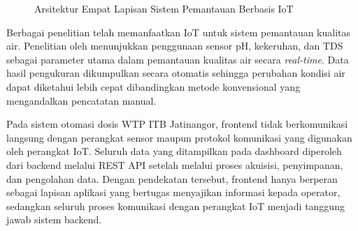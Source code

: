 \begin{figure}[H]
  \centering
  \caption{Arsitektur Empat Lapisan Sistem Pemantauan Berbasis IoT}
  \label{fig:arsitektur-iot}
\end{figure}

Berbagai penelitian telah memanfaatkan IoT untuk sistem pemantauan kualitas air.
Penelitian oleh \textcite{kumar2024iot} menunjukkan penggunaan sensor pH,
kekeruhan, dan TDS sebagai parameter utama dalam pemantauan kualitas air secara
\textit{real-time}. Data hasil pengukuran dikumpulkan secara otomatis sehingga
perubahan kondisi air dapat diketahui lebih cepat dibandingkan metode
konvensional yang mengandalkan pencatatan manual.

Pada sistem otomasi dosis WTP ITB Jatinangor, frontend tidak berkomunikasi
langsung dengan perangkat sensor maupun protokol komunikasi yang digunakan oleh
perangkat IoT. Seluruh data yang ditampilkan pada dashboard diperoleh dari
backend melalui REST API setelah melalui proses akuisisi, penyimpanan, dan
pengolahan data. Dengan pendekatan tersebut, frontend hanya berperan sebagai
lapisan aplikasi yang bertugas menyajikan informasi kepada operator, sedangkan
seluruh proses komunikasi dengan perangkat IoT menjadi tanggung jawab sistem
backend.

